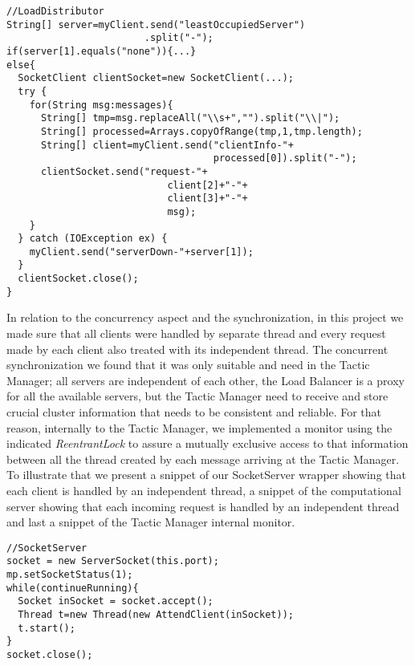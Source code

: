 \documentclass[12pt]{article}
\begin{document}
\begin{lstlisting}[label={loadDistributor}]
//LoadDistributor
String[] server=myClient.send("leastOccupiedServer")
                        .split("-");
if(server[1].equals("none")){...}
else{
  SocketClient clientSocket=new SocketClient(...);
  try {
    for(String msg:messages){
      String[] tmp=msg.replaceAll("\\s+","").split("\\|");
      String[] processed=Arrays.copyOfRange(tmp,1,tmp.length);
      String[] client=myClient.send("clientInfo-"+
                                    processed[0]).split("-");
      clientSocket.send("request-"+
                            client[2]+"-"+
                            client[3]+"-"+
                            msg);
    }
  } catch (IOException ex) {
    myClient.send("serverDown-"+server[1]);
  }
  clientSocket.close();
}
\end{lstlisting}

In relation to the concurrency aspect and the synchronization, in this project we made sure that all clients were handled by separate thread and every request made by each client also treated with its independent thread. The concurrent synchronization we found that it was only suitable and need in the Tactic Manager; all servers are independent of each other, the Load Balancer is a proxy for all the available servers, but the Tactic Manager need to receive and store crucial cluster information that needs to be consistent and reliable. For that reason, internally to the Tactic Manager, we implemented a monitor using the indicated \textit{ReentrantLock} to assure a mutually exclusive access to that information between all the thread created by each message arriving at the Tactic Manager.
To illustrate that we present a snippet of our SocketServer wrapper showing that each client is handled by an independent thread, a snippet of the computational server showing that each incoming request is handled by an independent thread and last a snippet of the Tactic Manager internal monitor.

\begin{lstlisting}
//SocketServer
socket = new ServerSocket(this.port);
mp.setSocketStatus(1);
while(continueRunning){
  Socket inSocket = socket.accept();
  Thread t=new Thread(new AttendClient(inSocket));
  t.start();
}
socket.close();
\end{lstlisting}
\end{document}
